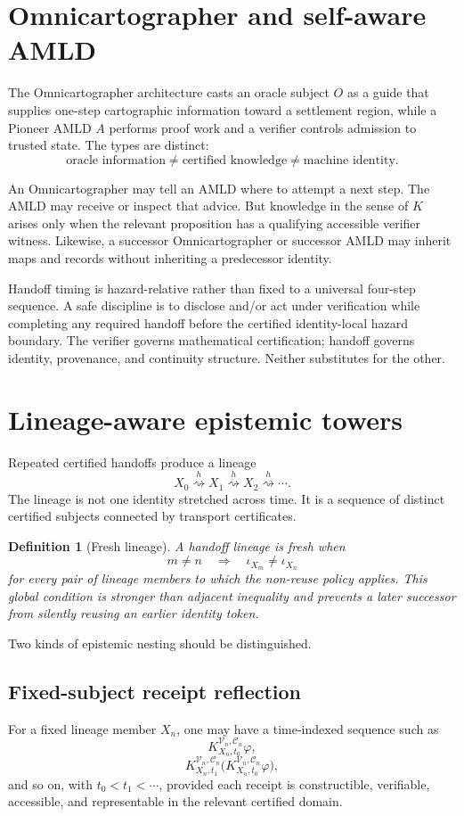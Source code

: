 \documentclass[11pt]{article}
\newtheorem{definition}{Definition}[section]
\theoremstyle{remark}
\newcommand{\K}[4]{K^{#3,#4}_{#1,#2}}
\newcommand{\handoff}{\mathrel{\overset{h}{\rightsquigarrow}}}
\begin{document}
\section{Omnicartographer and self-aware AMLD}

The Omnicartographer architecture casts an oracle subject $O$ as a guide that supplies one-step cartographic information toward a settlement region, while a Pioneer AMLD $A$ performs proof work and a verifier controls admission to trusted state. The types are distinct:
\[
\text{oracle information}\neq\text{certified knowledge}\neq\text{machine identity}.
\]

An Omnicartographer may tell an AMLD where to attempt a next step. The AMLD may receive or inspect that advice. But knowledge in the sense of $K$ arises only when the relevant proposition has a qualifying accessible verifier witness. Likewise, a successor Omnicartographer or successor AMLD may inherit maps and records without inheriting a predecessor identity.

Handoff timing is hazard-relative rather than fixed to a universal four-step sequence. A safe discipline is to disclose and/or act under verification while completing any required handoff before the certified identity-local hazard boundary.
The verifier governs mathematical certification; handoff governs identity, provenance, and continuity structure. Neither substitutes for the other.

\section{Lineage-aware epistemic towers}

Repeated certified handoffs produce a lineage
\[
X_0\handoff X_1\handoff X_2\handoff\cdots.
\]
The lineage is not one identity stretched across time. It is a sequence of distinct certified subjects connected by transport certificates.

\begin{definition}[Fresh lineage]
A handoff lineage is \emph{fresh} when
\[
m\neq n\quad\Longrightarrow\quad \iota_{X_m}\neq\iota_{X_n}
\]
for every pair of lineage members to which the non-reuse policy applies. This global condition is stronger than adjacent inequality and prevents a later successor from silently reusing an earlier identity token.
\end{definition}

Two kinds of epistemic nesting should be distinguished.

\subsection{Fixed-subject receipt reflection}
For a fixed lineage member $X_n$, one may have a time-indexed sequence such as
\[
\K{X_n}{t_0}{\mathcal V_n}{\mathcal C_n}\varphi,
\]
\[
\K{X_n}{t_1}{\mathcal V_n}{\mathcal C_n}
\bigl(\K{X_n}{t_0}{\mathcal V_n}{\mathcal C_n}\varphi\bigr),
\]
and so on, with $t_0<t_1<\cdots$, provided each receipt is constructible, verifiable, accessible, and representable in the relevant certified domain.
\end{document}
